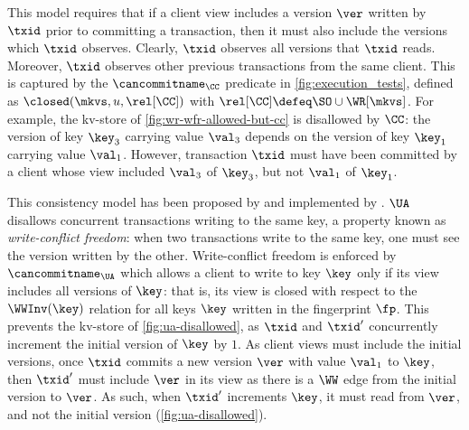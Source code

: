 
This model requires that 
if a client view includes 
a version \(\ver\) written by \( \txid \) prior to committing a transaction, 
then it must also include the versions which \(\txid\) observes.
Clearly, \(\txid\) observes all versions that \(\txid\) reads. 
Moreover, \(\txid\) observes other previous transactions from the same client.
This is captured by the \(\cancommitname_{\CC}\) predicate in \cref{fig:execution_tests}, 
defined as \(\closed(\mkvs, u, \rel[\CC])\) with \(\rel[\CC] \defeq \SO \cup \WR[\mkvs]\).
For example, the kv-store of \cref{fig:wr-wfr-allowed-but-cc} 
is disallowed by \(\CC\): the version of key \(\key_3\) carrying value \(\val_3\) depends on 
the version of key \(\key_1\) carrying value \(\val_1\). 
However, transaction \(\txid\) must have been committed by a client
whose view included \(\val_3\) of \( \key_3\), but not \(\val_1\) of \( \key_1\).

This consistency model has been proposed by \citet{framework-concur} 
and implemented by \citet{rola}.
\(\UA\) disallows concurrent transactions writing to the same key,
a property known as \emph{write-conflict freedom}:  
when two transactions write to the same key, one must see the version 
written by the other.
Write-conflict freedom is enforced by \(\cancommitname_{\UA}\) which allows a client to write to key \(\key\) only if its view includes all versions of \(\key\):
that is, its view is closed with respect to the \(\WWInv(\key)\) relation for all keys \(\key\) written in the fingerprint \(\fp\).
This prevents the kv-store of \cref{fig:ua-disallowed},
as \(\txid\) and \(\txid'\) concurrently increment the initial version of \(\key\) by \(1\).
As client views must include the initial versions, once \(\txid\) commits a new version \(\ver\) with value \(\val_1\) to \(\key\), then \(\txid'\) must include \(\ver\) in its view as there is a \(\WW\) edge from the initial version to \(\ver\). 
As such, when \(\txid'\) increments \(\key\), it must read from \(\ver\), and not the initial version (\cref{fig:ua-disallowed}).

